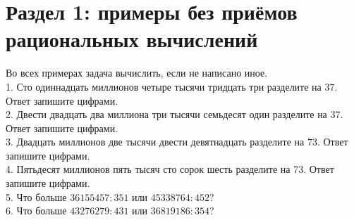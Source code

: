 \section{Раздел 1: примеры без приёмов рациональных вычислений}
Во всех примерах задача вычислить, если не написано иное.\\
1. Сто одиннадцать миллионов четыре тысячи тридцать три разделите на 37. Ответ запишите цифрами.\\
2. Двести двадцать два миллиона три тысячи семьдесят один разделите на 37. Ответ запишите цифрами.\\
3. Двадцать миллионов две тысячи двести девятнадцать разделите на 73. Ответ запишите цифрами.\\
4. Пятьдесят миллионов пять тысяч сто сорок шесть разделите на 73. Ответ запишите цифрами.\\
5. Что больше $36155457:351$ или $45338764:452?$\\
6. Что больше $43276279:431$ или $36819186:354?$\\
